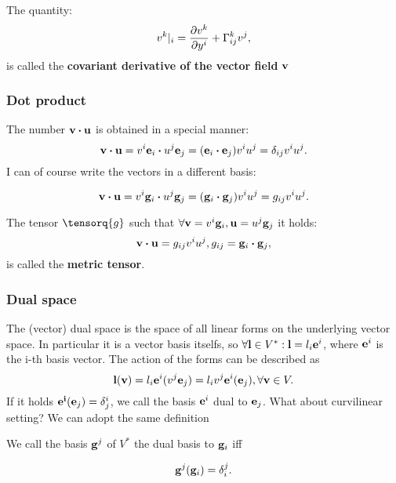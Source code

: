 \documentclass[reqno, a4paper]{article}
\begin{document}
\begin{definition}
    The quantity:
\begin{equation}
	v^k|_i = \pdv{v^k}{y^i}+\Gamma^k_{ij}v^j,
\end{equation}
is called the \textbf{covariant derivative of the vector field }$\vb{v}$
\end{definition}

\subsubsection{Dot product}
\label{sec:dot_product}

The number $\vb{v}\vdot \vb{u}$ is obtained in a special manner:
\[
	\vb{v} \vdot \vb{u}= v^i \vb{e}_i \vdot u^j \vb{e}_j = (\vb{e}_i \vdot \vb{e}_j) v^i u^j = \delta_{ij}v^i u^j.
\]
I can of course write the vectors in a different basis:

\[
	\vb{v}\vdot \vb{u} = v^i \vb{g}_i \vdot u^j \vb{g}_j = (\vb{g}_i \vdot \vb{g}_j) v^i u^j = g_{ij}v^i u^j.
\]

\begin{definition}
    The tensor $\tensorq{g}$ such that $\forall \vb{v} = v^i \vb{g}_i, \vb{u}= u^j \vb{g}_j$ it holds:
    \[
	    \vb{v} \vdot \vb{u}=g_{ij} v^i u^j, g_{ij}= \vb{g}_i \vdot \vb{g}_j,
    \]
    is called the \textbf{metric tensor}.
\end{definition}


\subsubsection{Dual space}
\label{sec:dual_space}

The (vector) dual space is the space of all linear forms on the underlying vector space. In particular it is a vector basis itselfs, so $\forall \vb{l} \in V^{*}: \vb{l} = l_i \vb{e}^i$, where $\vb{e}^i$ is the i-th basis vector. The action of the forms can be described as
\[
	\vb{l}(\vb{v}) = l_i \vb{e}^i(v^j \vb{e}_j) = l_i v^j \vb{e}^i(\vb{e}_j), \forall \vb{v} \in V.
\]
If it holds $\vb{e^i}(\vb{e}_j) = \delta^i_j$, we call the basis $\vb{e}^i$ dual to $\vb{e}_j$. What about curvilinear setting? We can adopt the same definition
\begin{definition}
    We call the basis $\vb{g}^j$ of $V^{*}$ the dual basis to $\vb{g}_i$ iff

\[
	\vb{g}^j(\vb{g}_i) = \delta^j_i.
\]
\end{definition}
\end{document}
